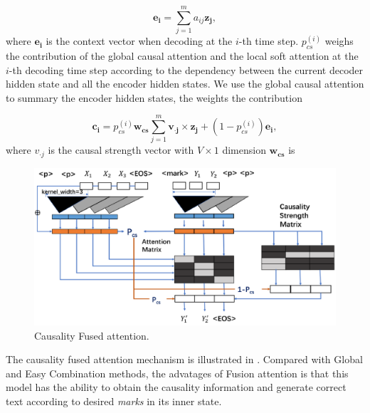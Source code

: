 \begin{equation}
\mathbf{e_i} = \sum_{j=1}^{m}a_{ij}\mathbf{z_j},
\end{equation}
where $\mathbf{e_i}$ is the context vector when decoding at the $i$-th time step. 
$p^{(i)}_{cs}$ weighs the contribution of the global causal attention and the local soft attention at the $i$-th decoding time step according to the dependency between the current decoder hidden state and all the encoder hidden states.
We use the global causal attention to summary the
encoder hidden states, the weights the contribution 


\begin{equation}
\mathbf{c_i} = p^{(i)}_{cs}\mathbf{w_{cs}}\sum_{j=1}^{m}\mathbf{v_{\boldsymbol{\cdot} j}} \times \mathbf{z_j}  + (1-p^{(i)}_{cs})\mathbf{e_i},
\end{equation}
where $v_{\cdot j}$ is the causal strength vector with $V \times 1$ dimension  $\mathbf{w_{cs}}$ is 
\begin{figure}[th]
    \centering
    \includegraphics[width=1.5\columnwidth]{fusedatt}
    \caption{Causality Fused attention. }
    \label{fig:fusedatt}
\end{figure}
The causality fused attention mechanism is illustrated in .
Compared with Global and Easy Combination methods, the advatages
of Fusion attention is that this model has the ability to 
obtain the causality information and generate correct text according
to desired \textit{marks} in its inner state.



